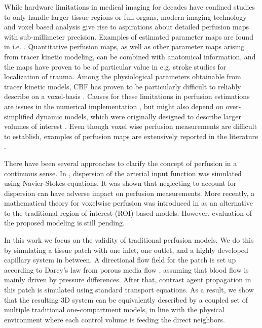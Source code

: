 \documentclass[journal,twocolumn]{IEEEtran}
\begin{document}
	While hardware limitations in medical imaging for decades have confined studies to only handle larger tissue regions or full organs, modern imaging technology and voxel based analysis give rise to aspirations about detailed perfusion maps with sub-millimeter precision.  
	Examples of estimated parameter maps are found in i.e. \cite{Feng2013,Chen2011}. 
	Quantitative perfusion maps, as well as other parameter maps arising from tracer kinetic modeling, can be combined with anatomical information, and the maps have proven to be of particular value in e.g. stroke studies for localization of trauma. 
	Among the physiological parameters obtainable from tracer kinetic models, CBF has proven to be particularly difficult to reliably describe on a voxel-basis \cite{kudo10}.
	Causes for these limitations in perfusion estimations are issues in the numerical implementation \cite{kudo10}, but might also depend on over-simplified dynamic models, which were originally designed to describe larger volumes of interest \cite{zierler00}.	
 	Even though voxel wise perfusion measurements are difficult to establish, examples of perfusion maps are extensively reported in the literature \cite{Feng2013,Chen2011}.
	
	There have been several approaches to clarify the concept of perfusion in a continuous sense.
	In \cite{calamante03}, dispersion of the arterial input function was simulated using Navier-Stokes equations.
	It was shown that neglecting to account for dispersion can have adverse impact on perfusion measurements.
	More recently, a mathematical theory for voxelwise perfusion was introduced in \cite{sourbron14} as an alternative to the traditional region of interest (ROI) based models.
	However, evaluation of the proposed modeling is still pending.
	
	In this work we focus on the validity of traditional perfusion models.
	We do this by simulating a tissue patch with one inlet, one outlet, and a highly developed capillary system in between.
	A directional flow field for the patch is set up according to Darcy's law from porous media flow \cite{Darcy56}, assuming that blood flow is mainly driven by pressure differences.	
	After that, contrast agent propagation in this patch is simulated using standard transport equations.%
	As a result, we show that the resulting 3D system can be equivalently described by a coupled set of multiple traditional one-compartment models, in line with the physical environment where each control volume is feeding the direct neighbors.
\end{document}
